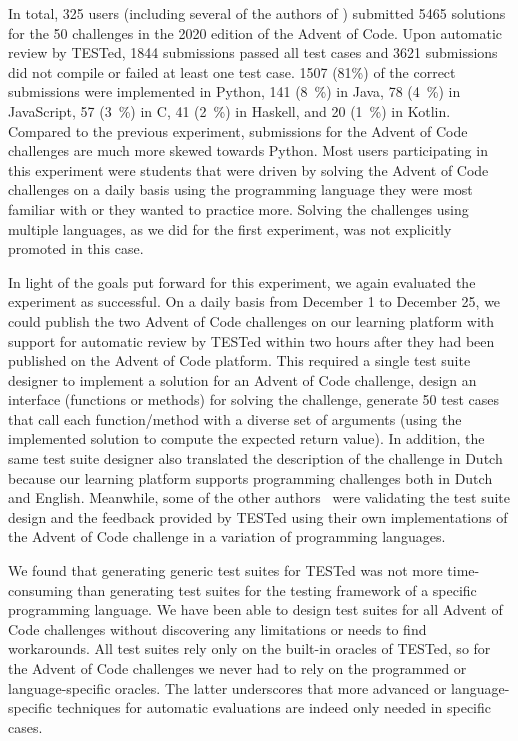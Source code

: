 \documentclass[../main]{subfiles}
\begin{document}
In total, \num{325} users (including several of the authors of \textcite{strijbolTESTedEducationalTesting2023}) submitted \num{5465} solutions for the \num{50} challenges in the 2020 edition of the Advent of Code.
Upon automatic review by TESTed, \num{1844} submissions passed all test cases and \num{3621} submissions did not compile or failed at least one test case.
\num{1507} (81\%) of the correct submissions were implemented in Python, \num{141} (\qty{8}{\percent}) in Java, \num{78} (\qty{4}{\percent}) in JavaScript, \num{57} (\qty{3}{\percent}) in C, \num{41} (\qty{2}{\percent}) in Haskell, and \num{20} (\qty{1}{\percent}) in Kotlin.
Compared to the previous experiment, submissions for the Advent of Code challenges are much more skewed towards Python.
Most users participating in this experiment were students that were driven by solving the Advent of Code challenges on a daily basis using the programming language they were most familiar with or they wanted to practice more.
Solving the challenges using multiple languages, as we did for the first experiment, was not explicitly promoted in this case.

In light of the goals put forward for this experiment, we again evaluated the experiment as successful.
On a daily basis from December 1 to December 25, we could publish the two Advent of Code challenges on our learning platform with support for automatic review by TESTed within two hours after they had been published on the Advent of Code platform.
This required a single test suite designer to implement a solution for an Advent of Code challenge, design an interface (functions or methods) for solving the challenge, generate 50 test cases that call each function/method with a diverse set of arguments (using the implemented solution to compute the expected return value).
In addition, the same test suite designer also translated the description of the challenge in Dutch because our learning platform supports programming challenges both in Dutch and English.
Meanwhile, some of the other authors~\autocite{strijbolTESTedEducationalTesting2023} were validating the test suite design and the feedback provided by TESTed using their own implementations of the Advent of Code challenge in a variation of programming languages.

We found that generating generic test suites for TESTed was not more time-consuming than generating test suites for the testing framework of a specific programming language.
We have been able to design test suites for all Advent of Code challenges without discovering any limitations or needs to find workarounds.
All test suites rely only on the built-in oracles of TESTed, so for the Advent of Code challenges we never had to rely on the programmed or language-specific oracles.
The latter underscores that more advanced or language-specific techniques for automatic evaluations are indeed only needed in specific cases.
\end{document}
